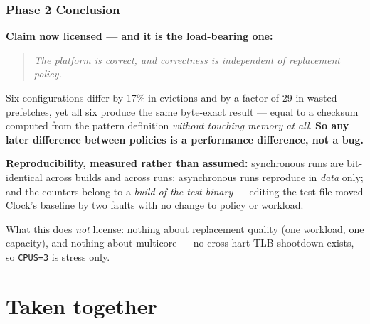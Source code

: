 \documentclass[10pt,aspectratio=169]{beamer}
\newcommand{\good}[1]{\textcolor{good}{#1}}
\newcommand{\warn}[1]{\textcolor{warn}{#1}}
\newcommand{\phasehead}[2]{%
  \frametitle{#1 \quad\small\normalfont\textcolor{white!75!accent}{#2}}}
\begin{document}
\begin{frame}
  \phasehead{Phase 2}{Conclusion}
  \small
  \textbf{\good{Claim now licensed --- and it is the load-bearing one:}}
  \begin{quote}
    \emph{The platform is correct, and correctness is independent of
    replacement policy.}
  \end{quote}
  Six configurations differ by 17\% in evictions and by a factor of 29 in
  wasted prefetches, yet all six produce the same byte-exact result --- equal to
  a checksum computed from the pattern definition \emph{without touching memory
  at all}. \textbf{So any later difference between policies is a performance
  difference, not a bug.}

  \medskip
  \textbf{Reproducibility, measured rather than assumed:} synchronous runs are
  bit-identical across builds and across runs; asynchronous runs reproduce in
  \emph{data} only; and the counters belong to a \emph{build of the test
  binary} --- editing the test file moved Clock's baseline by two faults with no
  change to policy or workload.

  \medskip
  \warn{What this does \emph{not} license:} nothing about replacement quality
  (one workload, one capacity), and nothing about multicore --- no cross-hart
  TLB shootdown exists, so \texttt{CPUS=3} is stress only.
\end{frame}


\section{Taken together}
\end{document}
